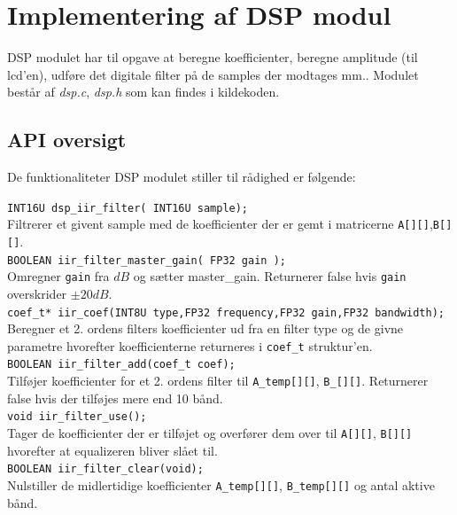 \section{Implementering af DSP modul}\label{sec:implementering_dsp}
DSP modulet har til opgave at beregne koefficienter, beregne amplitude (til lcd'en), udføre det 
digitale filter på de samples der modtages mm.. 
Modulet består af \textit{dsp.c}, \textit{dsp.h} som kan findes i kildekoden. 


\subsection{API oversigt}
De funktionaliteter DSP modulet stiller til rådighed er følgende:

\texttt{INT16U dsp\_iir\_filter( INT16U sample);}\\
Filtrerer et givent sample med de koefficienter der er gemt i matricerne \texttt{A[][]},\texttt{B[][]}.\\

\texttt{BOOLEAN iir\_filter\_master\_gain( FP32 gain ); }\\
Omregner \texttt{gain} fra $dB$ og sætter master\_gain. Returnerer false hvis \texttt{gain} overskrider $\pm 20dB$.\\

\texttt{coef\_t* iir\_coef(INT8U type,FP32 frequency,FP32 gain,FP32 bandwidth);}\\
Beregner et 2. ordens filters koefficienter ud fra en filter type og de givne parametre hvorefter koefficienterne returneres i \texttt{coef\_t} struktur'en.\\

\texttt{BOOLEAN iir\_filter\_add(coef\_t coef);}\\
Tilføjer koefficienter for et 2. ordens filter til \texttt{A\_temp[][]}, \texttt{B\_[][]}. Returnerer false hvis der tilføjes mere end 10 bånd.\\

\texttt{void iir\_filter\_use();} \\
Tager de koefficienter der er tilføjet og overfører dem over til \texttt{A[][]}, \texttt{B[][]} hvorefter at equalizeren bliver slået til.\\

\texttt{BOOLEAN iir\_filter\_clear(void);} \\ 
Nulstiller de midlertidige koefficienter \texttt{A\_temp[][]}, \texttt{B\_temp[][]} og antal aktive bånd. \\


